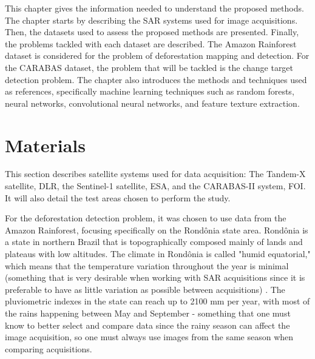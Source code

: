 This chapter gives the information needed to understand the proposed methods. The chapter starts by describing the SAR systems used for image acquisitions. Then, the datasets used to assess the proposed methods are presented. Finally, the problems tackled with each dataset are described. The Amazon Rainforest dataset is considered for the problem of deforestation mapping and detection. For the CARABAS dataset, the problem that will be tackled is the change target detection problem. The chapter also introduces the methods and techniques used as references, specifically machine learning techniques such as random forests, neural networks, convolutional neural networks, and feature texture extraction.

\section{Materials}
This section describes satellite systems used for data acquisition: The Tandem-X satellite, DLR, the Sentinel-1 satellite, ESA, and the CARABAS-II system, FOI. It will also detail the test areas chosen to perform the study.

For the deforestation detection problem, it was chosen to use data from the Amazon Rainforest, focusing specifically on the Rondônia state area. Rondônia is a state in northern Brazil that is topographically composed mainly of lands and plateaus with low altitudes. The climate in Rondônia is called "humid equatorial," which means that the temperature variation throughout the year is minimal (something that is very desirable when working with SAR acquisitions since it is preferable to have as little variation as possible between acquisitions) \cite{rondoniaGeography}. The pluviometric indexes in the state can reach up to 2100 mm per year, with most of the rains happening between May and September - something that one must know to better select and compare data since the rainy season can affect the image acquisition, so one must always use images from the same season when comparing acquisitions.

